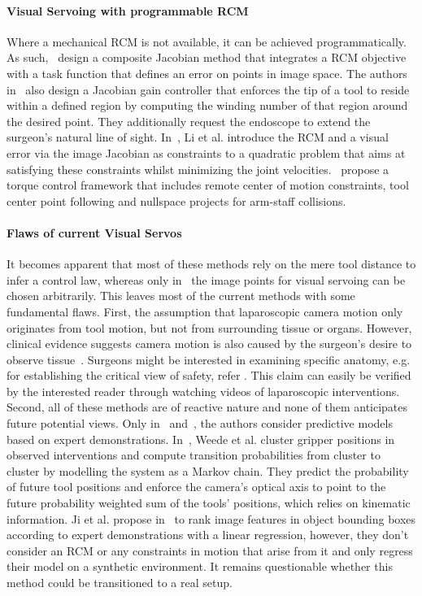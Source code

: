 \paragraph{Visual Servoing with programmable RCM}
Where a mechanical RCM is not available, it can be achieved programmatically. As such,~\cite{aghakhani2013task} design a composite Jacobian method that integrates a RCM objective with a task function that defines an error on points in image space. The authors in~\cite{yang2019adaptive} also design a Jacobian gain controller that enforces the tip of a tool to reside within a defined region by computing the winding number of that region around the desired point. They additionally request the endoscope to extend the surgeon's natural line of sight. In~\cite{li2020accelerated}, Li et al. introduce the RCM and a visual error via the image Jacobian as constraints to a quadratic problem that aims at satisfying these constraints whilst minimizing the joint velocities.~\cite{sandoval2021towards} propose a torque control framework that includes remote center of motion constraints, tool center point following and nullspace projects for arm-staff collisions.

\paragraph{Flaws of current Visual Servos} It becomes apparent that most of these methods rely on the mere tool distance to infer a control law, whereas only in~\cite{ma2019autonomous, ma2020visual, aghakhani2013task, yang2019adaptive, li2020accelerated} the image points for visual servoing can be chosen arbitrarily. This leaves most of the current methods with some fundamental flaws. First, the assumption that laparoscopic camera motion only originates from tool motion, but not from surrounding tissue or organs. However, clinical evidence suggests camera motion is also caused by the surgeon’s desire to observe tissue~\cite{ellis2016task}. Surgeons might be interested in examining specific anatomy, e.g. for establishing the critical view of safety, refer . This claim can easily be verified by the interested reader through watching videos of laparoscopic interventions. Second, all of these methods are of reactive nature and none of them anticipates future potential views. Only in~\cite{weede2011intelligent} and~\cite{ji2018learning}, the authors consider predictive models based on expert demonstrations. In~\cite{weede2011intelligent}, Weede et al. cluster gripper positions in observed interventions and compute transition probabilities from cluster to cluster by modelling the system as a Markov chain. They predict the probability of future tool positions and enforce the camera's optical axis to point to the future probability weighted sum of the tools' positions, which relies on kinematic information. Ji et al. propose in~\cite{ji2018learning} to rank image features in object bounding boxes according to expert demonstrations with a linear regression, however, they don't consider an RCM or any constraints in motion that arise from it and only regress their model on a synthetic environment. It remains questionable whether this method could be transitioned to a real setup.


